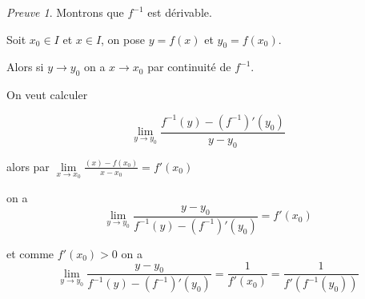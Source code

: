 \documentclass[]{article}
\theoremstyle{remark}
\newtheorem{myproof}{Preuve}
\theoremstyle{definition}
\begin{document}
\begin{myproof}
	Montrons que $f^{-1}$ est dérivable.
	
	Soit $x_0 \in I$ et $x \in I$, on pose $y=f(x)$ et $y_0=f(x_0)$.
	
	Alors si $y \longrightarrow y_0$ on a $x \longrightarrow x_0$ par continuité de $f^{-1}$.
	
	On veut calculer
	
	$$\lim\limits_{y \to y_0} \frac{f^{-1}(y) - (f^{-1})'(y_0)}{y-y_0}$$
	
	alors par $\lim\limits_{x \to x_0} \frac{(x)-f(x_0)}{x - x_0} = f'(x_0)$
	
	on a $$\lim\limits_{y \to y_0} \frac{y-y_0}{f^{-1}(y) - (f^{-1})'(y_0)} = f'(x_0)$$
		
	et comme $f'(x_0) > 0$ on a $$\lim\limits_{y \to y_0} \frac{y-y_0}{f^{-1}(y) - (f^{-1})'(y_0)} = \frac{1}{f'(x_0)} = \frac{1}{f'(f^{-1}(y_0))}$$ 
\end{myproof}
\end{document}
